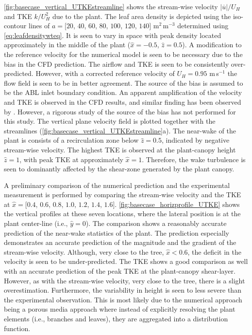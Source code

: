 \cref{fig:basecase_vertical_UTKEstreamline} shows the stream-wise velocity $|\overline{u}|/U_H$ and TKE $k/U_H^2$ due to the plant. The leaf area density is depicted using the iso-contour lines of $a = [20$, $40$, $60$, $80$, $100$, $120$, $140]$ m$^2$\,m$^{-3}$ determined using \cref{eq:leafdensitywteq}. It is seen to vary in space with peak density located approximately in the middle of the plant ($\hat{x}=-0.5$, $\hat{z}=0.5$). A modification to the reference velocity for the numerical model is seen to be necessary due to the bias in the CFD prediction. The airflow and TKE is seen to be consistently over-predicted. However, with a corrected reference velocity of $U_H = 0.95$ m\,s$^{-1}$ the flow field is seen to be in better agreement. The source of the bias is assumed to be the ABL inlet boundary condition. An apparent amplification of the velocity and TKE is observed in the CFD results, and similar finding has been observed by \cite{Blocken2007b}. However, a rigorous study of the source of the bias has not performed for this study. The vertical plane velocity field is plotted together with the streamlines (\cref{fig:basecase_vertical_UTKEstreamline}a). The near-wake of the plant is consists of a recirculation zone below $\hat{z} = 0.5$, indicated by negative stream-wise velocity. The highest TKE is observed at the plant-canopy height $\hat{z} = 1$, with peak TKE at approximately $\hat{x} = 1$. Therefore, the wake turbulence is seen to dominantly affected by the shear-zone generated by the plant canopy.

A preliminary comparison of the numerical prediction and the experimental measurement is performed by comparing the stream-wise velocity and the TKE at $\hat{x} = [0.4$, $0.6$, $0.8$, $1.0$, $1.2$, $1.4$, $1.6]$. \cref{fig:basecase_horizprofile_UTKE} shows the vertical profiles at these seven locations, where the lateral position is at the plant center-line (i.e., $\hat{y} = 0$).  The comparison shows a reasonably accurate prediction of the near-wake statistics of the plant. The prediction especially demonstrates an accurate prediction of the magnitude and the gradient of the stream-wise velocity. Although, very close to the tree, $\hat{x} < 0.6$, the deficit in the velocity is seen to be under-predicted. The TKE shows a good comparison as well with an accurate prediction of the peak TKE at the plant-canopy shear-layer. However, as with the stream-wise velocity, very close to the tree, there is a slight overestimation. Furthermore, the variability in height is seen to less severe than the experimental observation. This is most likely due to the numerical approach being a porous media approach where instead of explicitly resolving the plant elements (i.e., branches and leaves), they are aggregated into a distribution function.

